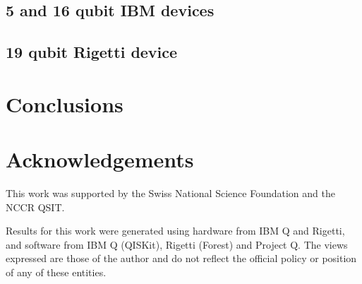 \documentclass[aps,prl,twocolumn,showpacs,preprintnumbers]{revtex4-1}
\begin{document}
\subsection{5 and 16 qubit IBM devices}

\subsection{19 qubit Rigetti device}




\section{Conclusions}






\section{Acknowledgements}

This work was supported by the Swiss National Science Foundation and the NCCR QSIT.

Results for this work were generated using hardware from IBM Q and Rigetti, and software from IBM Q (QISKit), Rigetti (Forest) and Project Q. The views expressed are those of the author and do not reflect the official policy or position of any of these entities.



\end{document}
